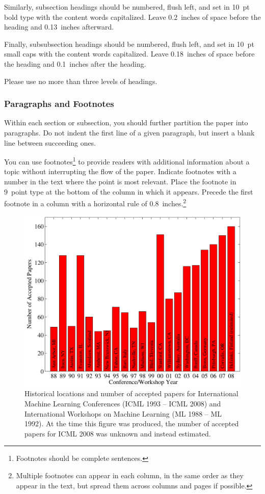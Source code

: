 \documentclass{article}
\begin{document}
Similarly, subsection headings should be numbered, flush left, and set
in 10~pt bold type with the content words capitalized. Leave
0.2~inches of space before the heading and 0.13~inches afterward.

Finally, subsubsection headings should be numbered, flush left, and
set in 10~pt small caps with the content words capitalized. Leave
0.18~inches of space before the heading and 0.1~inches after the
heading.

Please use no more than three levels of headings.

\subsubsection{Paragraphs and Footnotes}

Within each section or subsection, you should further partition the
paper into paragraphs. Do not indent the first line of a given
paragraph, but insert a blank line between succeeding ones.

You can use footnotes\footnote{Footnotes
should be complete sentences.} to provide readers with additional
information about a topic without interrupting the flow of the paper.
Indicate footnotes with a number in the text where the point is most
relevant. Place the footnote in 9~point type at the bottom of the
column in which it appears. Precede the first footnote in a column
with a horizontal rule of 0.8~inches.\footnote{Multiple footnotes can
appear in each column, in the same order as they appear in the text,
but spread them across columns and pages if possible.}

\begin{figure}[ht]
\vskip 0.2in
\begin{center}
\centerline{\includegraphics[width=\columnwidth]{icml_numpapers}}
\caption{Historical locations and number of accepted papers for International
Machine Learning Conferences (ICML 1993 -- ICML 2008) and International
Workshops on Machine Learning (ML 1988 -- ML 1992). At the time this figure was
produced, the number of accepted papers for ICML 2008 was unknown and instead
estimated.}
\label{icml-historical}
\end{center}
\vskip -0.2in
\end{figure}
\end{document}
